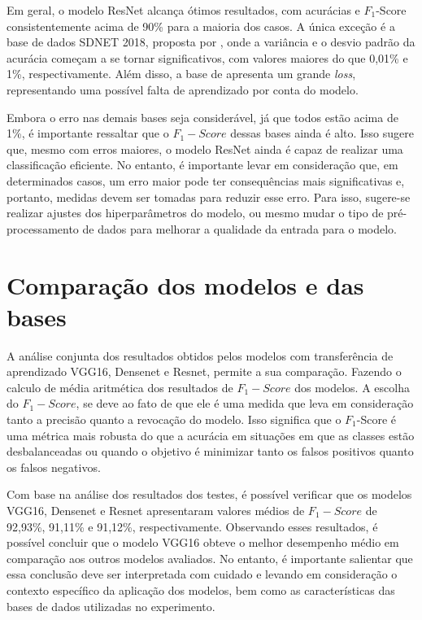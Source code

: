 Em geral, o modelo ResNet alcança ótimos resultados, com acurácias e $F_{1}$-Score consistentemente acima de 90\% para a maioria dos casos. 
A única exceção é a base de dados SDNET 2018, proposta por , onde a variância e o desvio padrão da acurácia começam a se tornar significativos, com valores maiores do que 0,01\% e 1\%, respectivamente. 
Além disso, a base de  apresenta um grande \textit{loss}, representando uma possível falta de aprendizado por conta do modelo.

Embora o erro nas demais bases seja considerável, já que todos estão acima de 1\%, é importante ressaltar que o $F_{1}-Score$ dessas bases ainda é alto. 
Isso sugere que, mesmo com erros maiores, o modelo ResNet ainda é capaz de realizar uma classificação eficiente. 
No entanto, é importante levar em consideração que, em determinados casos, um erro maior pode ter consequências mais significativas e, portanto, medidas devem ser tomadas para reduzir esse erro.
Para isso, sugere-se realizar ajustes dos hiperparâmetros do modelo, ou mesmo mudar o tipo de pré-processamento de dados para melhorar a qualidade da entrada para o modelo.

\section{Comparação dos modelos e das bases}
\label{sub:compa}

A análise conjunta dos resultados obtidos pelos modelos com transferência de aprendizado VGG16, Densenet e Resnet, permite a sua comparação.
Fazendo o calculo de média aritmética dos resultados de $F_{1}-Score$ dos modelos.
A escolha do $F_{1}-Score$, se deve ao fato de que ele é uma medida que leva em consideração tanto a precisão quanto a revocação do modelo. 
Isso significa que o $F_{1}$-Score é uma métrica mais robusta do que a acurácia em situações em que as classes estão desbalanceadas ou quando o objetivo é minimizar tanto os falsos positivos quanto os falsos negativos.

Com base na análise dos resultados dos testes, é possível verificar que os modelos VGG16, Densenet e Resnet apresentaram valores médios de $F_{1}-Score$ de 92,93\%, 91,11\% e 91,12\%, respectivamente.
Observando esses resultados, é possível concluir que o modelo VGG16 obteve o melhor desempenho médio em comparação aos outros modelos avaliados. 
No entanto, é importante salientar que essa conclusão deve ser interpretada com cuidado e levando em consideração o contexto específico da aplicação dos modelos, bem como as características das bases de dados utilizadas no experimento.


